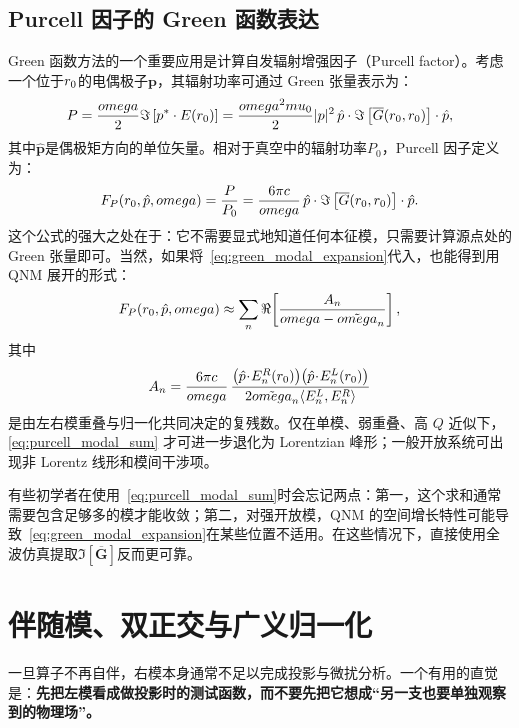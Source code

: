 \subsection{Purcell 因子的 Green 函数表达}
Green 函数方法的一个重要应用是计算自发辐射增强因子（Purcell factor）。考虑一个位于$r_0$的电偶极子$\bm{p}$，其辐射功率可通过 Green 张量表示为：
\begin{equation}
P = \frac{omega}{2}\Im\left[p^*\cdot E(r_0)\right]
= \frac{omega^2mu_0}{2}|p|^2\,\hat{p}\cdot\Im\left[\overline{G}(r_0,r_0)\right]\cdot\hat{p},
\label{eq:radiated_power_green}
\end{equation}
其中$\hat{\bm{p}}$是偶极矩方向的单位矢量。相对于真空中的辐射功率$P_0$，Purcell 因子定义为：
\begin{equation}
F_P(r_0,\hat{p},omega) = \frac{P}{P_0}
= \frac{6\pi c}{omega}\,\hat{p}\cdot\Im\left[\overline{G}(r_0,r_0)\right]\cdot\hat{p}.
\label{eq:purcell_factor_green}
\end{equation}
这个公式的强大之处在于：它不需要显式地知道任何本征模，只需要计算源点处的 Green 张量即可。当然，如果将~\cref{eq:green_modal_expansion}代入，也能得到用 QNM 展开的形式：
\begin{equation}
F_P(r_0,\hat{p},omega)
\approx
\sum_n \Re\!\left[\frac{A_n}{omega-\tilde{omega}_n}\right],
\label{eq:purcell_modal_sum}
\end{equation}
其中
\[
A_n=
\frac{6\pi c}{omega}\,
\frac{\bigl(\hat{p}\!\cdot\!E_n^{R}(r_0)\bigr)\bigl(\hat{p}\!\cdot\!E_n^{L}(r_0)\bigr)}
{2\tilde{omega}_n\langle E_n^{L},E_n^{R}\rangle}
\]
是由左右模重叠与归一化共同决定的复残数。仅在单模、弱重叠、高 $Q$ 近似下，\cref{eq:purcell_modal_sum} 才可进一步退化为 Lorentzian 峰形；一般开放系统可出现非 Lorentz 线形和模间干涉项。

\begin{WhatCouldGoWrong}
有些初学者在使用~\cref{eq:purcell_modal_sum}时会忘记两点：第一，这个求和通常需要包含足够多的模才能收敛；第二，对强开放模，QNM 的空间增长特性可能导致~\cref{eq:green_modal_expansion}在某些位置不适用。在这些情况下，直接使用全波仿真提取$\Im[\overline{\bm{G}}]$反而更可靠。
\end{WhatCouldGoWrong}

\section{伴随模、双正交与广义归一化}
一旦算子不再自伴，右模本身通常不足以完成投影与微扰分析。一个有用的直觉是：\textbf{先把左模看成做投影时的测试函数，而不要先把它想成“另一支也要单独观察到的物理场”。}

